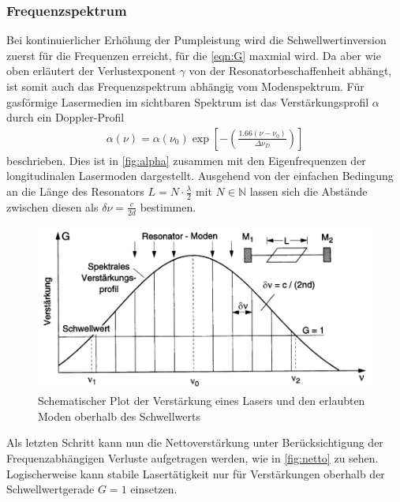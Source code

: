 \subsubsection{Frequenzspektrum}\label{subsubsec:frequenzen}
Bei kontinuierlicher Erhöhung der Pumpleistung wird die Schwellwertinversion zuerst für die Frequenzen erreicht, für die \autoref{eqn:G} maxmial wird.
Da aber wie oben erläutert der Verlustexponent $\gamma$ von der Resonatorbeschaffenheit abhängt, ist somit auch das Frequenzspektrum abhängig vom Modenspektrum.
Für gasförmige Lasermedien im sichtbaren Spektrum ist das Verstärkungsprofil $\alpha$ durch ein Doppler-Profil 
\begin{align}
    \alpha(\nu)=\alpha(\nu_0)\exp{\left[-\left(\frac{1.66(\nu-\nu_0)}{\Delta\nu_D}\right)\right]}\label{eqn:doppler}
\end{align}
beschrieben. Dies ist in \autoref{fig:alpha} zusammen mit den Eigenfrequenzen der longitudinalen Lasermoden dargestellt. Ausgehend von der einfachen Bedingung an die Länge des Resonators $L = N\cdot\frac{\lambda}{2}$ mit $N\in\mathbb{N}$ lassen sich die Abstände zwischen diesen als $\delta\nu=\frac{c}{2d}$ bestimmen.
\begin{figure}[H]
    \centering
    \includegraphics[scale=0.5]{Ressourcen/alpha.png}
    \caption{Schematischer Plot der Verstärkung eines Lasers und den erlaubten Moden oberhalb des Schwellwerts}\label{fig:alpha}
\end{figure}
Als letzten Schritt kann nun die Nettoverstärkung unter Berücksichtigung der Frequenzabhängigen Verluste aufgetragen werden, wie in \autoref{fig:netto} zu sehen. Logischerweise kann stabile Lasertätigkeit nur für Verstärkungen oberhalb der Schwellwertgerade $G=1$ einsetzen.

